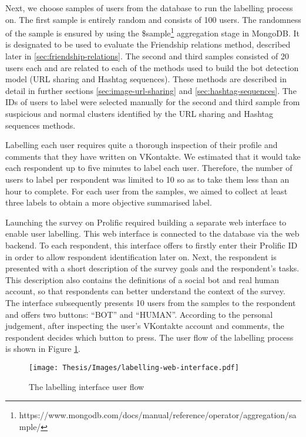 Next, we choose samples of users from the database to run the labelling process on. The first sample is entirely random and consists of 100 users. The randomness of the sample is ensured by using the \$sample\footnote{https://www.mongodb.com/docs/manual/reference/operator/aggregation/sample/} aggregation stage in MongoDB. It is designated to be used to evaluate the Friendship relations method, described later in \ref{sec:friendship-relations}. The second and third samples consisted of 20 users each and are related to each of the methods used to build the bot detection model (URL sharing and Hashtag sequences). These methods are described in detail in further sections \ref{sec:image-url-sharing} and \ref{sec:hashtag-sequences}. The IDs of users to label were selected manually for the second and third sample from suspicious and normal clusters identified by the URL sharing and Hashtag sequences methods. 

Labelling each user requires quite a thorough inspection of their profile and comments that they have written on VKontakte. We estimated that it would take each respondent up to five minutes to label each user. Therefore, the number of users to label per respondent was limited to 10 so as to take them less than an hour to complete. For each user from the samples, we aimed to collect at least three labels to obtain a more objective summarised label.

Launching the survey on Prolific required building a separate web interface to enable user labelling. This web interface is connected to the database via the web backend. To each respondent, this interface offers to firstly enter their Prolific ID in order to allow respondent identification later on. Next, the respondent is presented with a short description of the survey goals and the respondent's tasks. This description also contains the definitions of a social bot and real human account, so that respondents can better understand the context of the survey. The interface subsequently presents 10 users from the samples to the respondent and offers two buttons: ``BOT'' and ``HUMAN''. According to the personal judgement, after inspecting the user's VKontakte account and comments, the respondent decides which button to press. The user flow of the labelling process is shown in Figure \ref{fig:labelling-user-flow}.

\begin{figure}
	\centering
	\texttt{[image: Thesis/Images/labelling-web-interface.pdf]}
	\caption{The labelling interface user flow}
	\label{fig:labelling-user-flow}
\end{figure}

